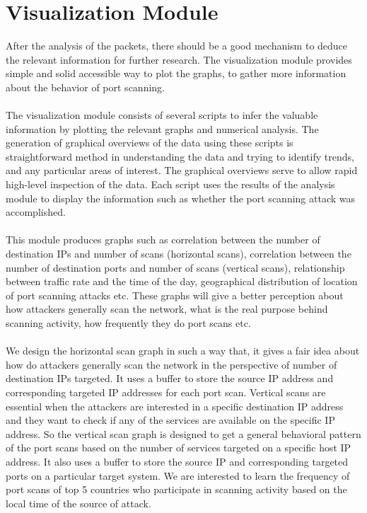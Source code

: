 \section{Visualization Module}
After the analysis of the packets, there should be a good mechanism to deduce the
relevant information for further research.
The visualization module provides simple and solid accessible way to plot the graphs, to gather more information about the behavior of port scanning.\\\\
The visualization module consists of several scripts to infer the valuable information by plotting the relevant graphs and numerical analysis.
The generation of graphical overviews of the data using these scripts is straightforward method in  understanding the data and trying to identify trends, and any particular areas of interest.
The graphical overviews serve to allow rapid high-level inspection of the data. 
Each script uses the results of the analysis module to display the information such as whether the port scanning attack was accomplished.\\\\
This module produces graphs such as correlation between the number of destination IPs and number of scans (horizontal scans), correlation between the number of destination ports and number of scans (vertical scans), relationship between traffic rate and the time of the day, geographical distribution of location of port scanning attacks etc.
These graphs will give a better perception about how attackers generally scan the network, what is the real purpose behind scanning activity, how frequently they do port scans etc.\\\\
We design the horizontal scan graph in such a way that, it gives a fair idea about how do attackers generally scan the network in the perspective of number of destination IPs targeted.
It uses a buffer to store the source IP address and corresponding targeted IP addresses for each port scan.
Vertical scans are essential when the attackers are interested in a specific destination IP address and they want to check if any of the services are available on the specific IP address.
So the vertical scan graph is designed to get a general behavioral pattern of the port scans based on the number of services targeted on a specific host IP address.
It also uses a buffer to store the source IP and corresponding targeted ports on a particular target system.
We are interested to learn the frequency of port scans of top 5 countries who participate in scanning activity based on the local time of the source of attack.
